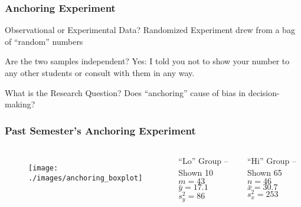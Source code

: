 \begin{frame}
\frametitle{Anchoring Experiment}
\small
\singlespacing
%
%

\begin{block}{Observational or Experimental Data?} 
Randomized Experiment drew from a bag of ``random'' numbers 
\end{block}

\begin{block}{Are the two samples independent?}
Yes: I told you not to show your number to any other students or consult with them in any way. 
\end{block}

\begin{block}{What is the Research Question?} 
Does ``anchoring'' cause of bias in decision-making? 
\end{block}
\end{frame}
\begin{frame}[t]
\frametitle{Past Semester's Anchoring Experiment}

\begin{columns}
	\begin{figure}
	\centering
	\texttt{[image: ./images/anchoring\_boxplot]}
	\end{figure}

	\begin{block}{``Lo'' Group -- Shown 10 }
	$m = 43$\\ $\bar{y} = 17.1$ \\ $s^2_{y} = 86$
\end{block}
		\begin{block}{``Hi'' Group -- Shown 65 }
		$n =46$\\ $\bar{x} = 30.7$\\ $s^2_{x} = 253$
\end{block}

\end{columns}
\end{frame}
